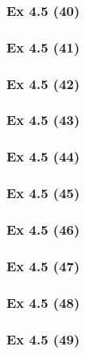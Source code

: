 \subsubsection{Ex 4.5 (40)}\label{sec:Ex_4.5.40}

\newpage		%

\subsubsection{Ex 4.5 (41)}\label{sec:Ex_4.5.41}

\subsubsection{Ex 4.5 (42)}\label{sec:Ex_4.5.42}

\subsubsection{Ex 4.5 (43)}\label{sec:Ex_4.5.43}

\subsubsection{Ex 4.5 (44)}\label{sec:Ex_4.5.44}

\subsubsection{Ex 4.5 (45)}\label{sec:Ex_4.5.45}

\subsubsection{Ex 4.5 (46)}\label{sec:Ex_4.5.46}

\subsubsection{Ex 4.5 (47)}\label{sec:Ex_4.5.47}

\subsubsection{Ex 4.5 (48)}\label{sec:Ex_4.5.48}

\subsubsection{Ex 4.5 (49)}\label{sec:Ex_4.5.49}


